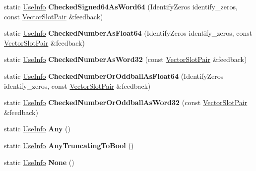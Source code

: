 \begin{DoxyCompactItemize}
static \mbox{\hyperlink{classv8_1_1internal_1_1compiler_1_1UseInfo}{Use\+Info}} {\bfseries Checked\+Signed64\+As\+Word64} (Identify\+Zeros identify\+\_\+zeros, const \mbox{\hyperlink{classv8_1_1internal_1_1VectorSlotPair}{Vector\+Slot\+Pair}} \&feedback)
\item 
\mbox{\label{classv8_1_1internal_1_1compiler_1_1UseInfo_ac4528d61eef18afe83b816733dbfc9af}} 
static \mbox{\hyperlink{classv8_1_1internal_1_1compiler_1_1UseInfo}{Use\+Info}} {\bfseries Checked\+Number\+As\+Float64} (Identify\+Zeros identify\+\_\+zeros, const \mbox{\hyperlink{classv8_1_1internal_1_1VectorSlotPair}{Vector\+Slot\+Pair}} \&feedback)
\item 
\mbox{\label{classv8_1_1internal_1_1compiler_1_1UseInfo_afbd5e49c26e5dfcb844bfadec1c3c000}} 
static \mbox{\hyperlink{classv8_1_1internal_1_1compiler_1_1UseInfo}{Use\+Info}} {\bfseries Checked\+Number\+As\+Word32} (const \mbox{\hyperlink{classv8_1_1internal_1_1VectorSlotPair}{Vector\+Slot\+Pair}} \&feedback)
\item 
\mbox{\label{classv8_1_1internal_1_1compiler_1_1UseInfo_aabc678ce7480ca77a4160d7fb3bb26df}} 
static \mbox{\hyperlink{classv8_1_1internal_1_1compiler_1_1UseInfo}{Use\+Info}} {\bfseries Checked\+Number\+Or\+Oddball\+As\+Float64} (Identify\+Zeros identify\+\_\+zeros, const \mbox{\hyperlink{classv8_1_1internal_1_1VectorSlotPair}{Vector\+Slot\+Pair}} \&feedback)
\item 
\mbox{\label{classv8_1_1internal_1_1compiler_1_1UseInfo_a29a9874ebcbe21b6b5d7849bb422ba8b}} 
static \mbox{\hyperlink{classv8_1_1internal_1_1compiler_1_1UseInfo}{Use\+Info}} {\bfseries Checked\+Number\+Or\+Oddball\+As\+Word32} (const \mbox{\hyperlink{classv8_1_1internal_1_1VectorSlotPair}{Vector\+Slot\+Pair}} \&feedback)
\item 
\mbox{\label{classv8_1_1internal_1_1compiler_1_1UseInfo_a9d2612ea8cac48c36174aa5440f964f2}} 
static \mbox{\hyperlink{classv8_1_1internal_1_1compiler_1_1UseInfo}{Use\+Info}} {\bfseries Any} ()
\item 
\mbox{\label{classv8_1_1internal_1_1compiler_1_1UseInfo_a52ec8bfdb500e28352a0bd8a7812b6fc}} 
static \mbox{\hyperlink{classv8_1_1internal_1_1compiler_1_1UseInfo}{Use\+Info}} {\bfseries Any\+Truncating\+To\+Bool} ()
\item 
\mbox{\label{classv8_1_1internal_1_1compiler_1_1UseInfo_a385de64141fe6288e2059fa412fca4b0}} 
static \mbox{\hyperlink{classv8_1_1internal_1_1compiler_1_1UseInfo}{Use\+Info}} {\bfseries None} ()
\end{DoxyCompactItemize}


